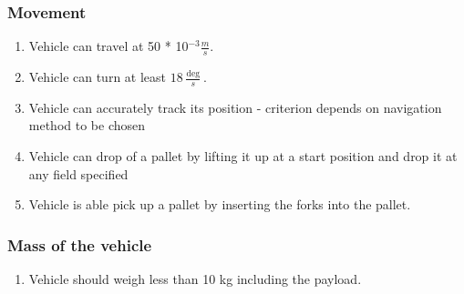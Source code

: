 \documentclass[../report.tex]{subfiles}
\begin{document}
        \subsubsection{Movement}
           \begin{center}
                \begin{enumerate}
                    \item Vehicle can travel at 50 * 10$^{-3} \frac{m}{s}$.
                    \item Vehicle can turn at least $18 \frac{\deg }{s}$. %
                    \item Vehicle can accurately track its position - criterion depends on navigation method to be chosen
                    \item Vehicle can drop of a pallet by lifting it up at a start position and drop it at any field specified
                    \item Vehicle is able pick up a pallet by inserting the forks into the pallet. %
                \end{enumerate}
            \end{center}

        \subsubsection{Mass of the vehicle}
        \begin{center}
            \begin{enumerate}
                \item Vehicle should weigh less than 10 kg including the payload. %
            \end{enumerate}
        \end{center}
\end{document}

